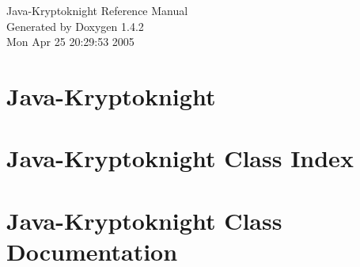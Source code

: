 \documentclass[a4paper]{book}
\begin{document}
\begin{titlepage}
\vspace*{7cm}
\begin{center}
{\Large Java-Kryptoknight Reference Manual}\\
\vspace*{1cm}
{\large Generated by Doxygen 1.4.2}\\
\vspace*{0.5cm}
{\small Mon Apr 25 20:29:53 2005}\\
\end{center}
\end{titlepage}
\clearemptydoublepage
{}
\tableofcontents
\clearemptydoublepage
{}
\chapter{Java-Kryptoknight }
\label{index}\hypertarget{index}{}
\chapter{Java-Kryptoknight Class Index}

\chapter{Java-Kryptoknight Class Documentation}









\printindex
\end{document}
